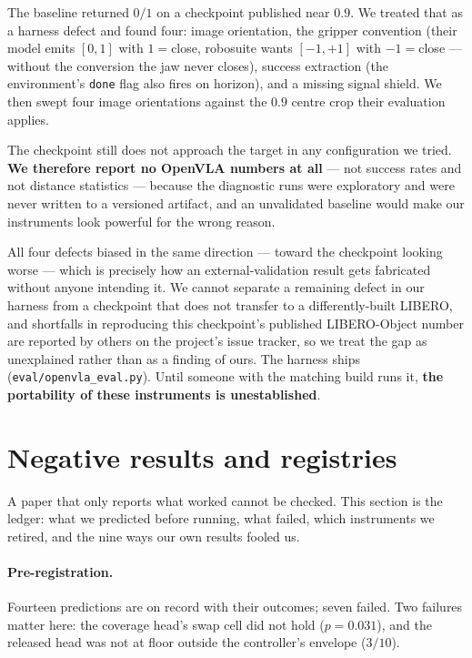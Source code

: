 \documentclass[10pt,twocolumn]{article}
\begin{document}
The baseline returned $0/1$ on a checkpoint published near $0.9$. We treated
that as a harness defect and found four: image orientation, the gripper
convention (their model emits $[0,1]$ with $1{=}$close, robosuite wants
$[-1,+1]$ with $-1{=}$close --- without the conversion the jaw never closes),
success extraction (the environment's \texttt{done} flag also fires on
horizon), and a missing signal shield. We then swept four image orientations
against the $0.9$ centre crop their evaluation applies.

The checkpoint still does not approach the target in any configuration we
tried. \textbf{We therefore report no OpenVLA numbers at all} --- not success
rates and not distance statistics --- because the diagnostic runs were
exploratory and were never written to a versioned artifact, and an unvalidated
baseline would make our instruments look powerful for the wrong reason.

All four defects biased in the same direction --- toward the checkpoint
looking worse --- which is precisely how an external-validation result gets
fabricated without anyone intending it. We cannot separate a remaining defect
in our harness from a checkpoint that does not transfer to a differently-built
LIBERO, and shortfalls in reproducing this checkpoint's published
LIBERO-Object number are reported by others on the project's issue tracker, so
we treat the gap as unexplained rather than as a finding of ours. The harness ships
(\texttt{eval/openvla\_eval.py}). Until someone with the matching build runs
it, \textbf{the portability of these instruments is unestablished}.

\section{Negative results and registries}
\label{sec:neg}

A paper that only reports what worked cannot be checked. This section is the
ledger: what we predicted before running, what failed, which instruments we
retired, and the nine ways our own results fooled us.

\paragraph{Pre-registration.} Fourteen predictions are on record with their
outcomes; seven failed. Two failures matter here: the coverage head's swap cell
did not hold ($p{=}0.031$), and the released head was not at floor outside the
controller's envelope ($3/10$).
\end{document}
